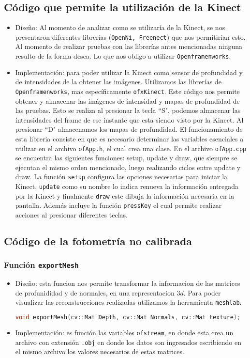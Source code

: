 \documentclass[twocolumn,11pts]{IEEEtran}
\begin{document}
\subsection{Código que permite la utilización de la Kinect}
\begin{itemize}
\item Diseño: Al momento de analizar como se utilizaría de la Kinect, se nos presentaron diferentes librerías (\texttt{OpenNi, Freenect}) que nos permitirían esto. Al momento de realizar pruebas con las librerías antes mencionadas ninguna resulto de la forma desea. Lo que nos obligo a utilizar \texttt{Openframenworks}.
\item Implementación: para poder utilizar la Kinect como sensor de profundidad y de intensidades de la obtener las imágenes. Utilizamos las librerías de \texttt{Openframenworks}, mas específicamente \texttt{ofxKinect}. Este código nos permite obtener y almacenar las imágenes de intensidad y mapas de profundidad de las pruebas. Esto se realiza al presionar la tecla ``S", podemos almacenar las intensidades del frame de ese instante que esta siendo visto por la Kinect. Al presionar ``D" almacenamos los mapas de profundidad. El funcionamiento de esta libreria consiste en que es necesario determinar las variables esenciales a utilizar en el archivo \texttt{ofApp.h}, el cual crea una clase. En el archivo \texttt{ofApp.cpp} se encuentra las siguientes funciones: setup, update y draw, que siempre se ejecutan el mismo orden mencionado, luego realizando ciclos entre update y draw. 
La función \texttt{setup} configura las opciones necesarias para iniciar la Kinect, \texttt{update} como su nombre lo indica renueva la información entregada por la Kinect y finalmente \texttt{draw} este dibuja la información necesaria en la pantalla. Además incluye la función \texttt{pressKey} el cual permite realizar acciones al presionar diferentes teclas.
\end{itemize}


\subsection{Código de la fotometría no calibrada}
\subsubsection{Función \texttt{exportMesh}}
\begin{itemize}
\item Diseño: esta funcion nos permite transformar la informacion de las matrices de profunididad y de normales, en una representacion $3d$. Para poder visualizar las reconstrucciones realizadas utilizamos la herramienta \texttt{meshlab}.
\begin{lstlisting}[float,language=C++,caption={Prototipo función \texttt{exportMesh}.},label=cod:c1]
void exportMesh(cv::Mat Depth, cv::Mat Normals, cv::Mat texture);
\end{lstlisting}
\item Implementación: es función las variables \texttt{ofstream}, en donde esta crea un archivo con extensión \texttt{.obj} en donde los datos son ingresados escribiendo en el mismo archivo los valores necesarios de estas matrices.
\end{itemize}
\end{document}
